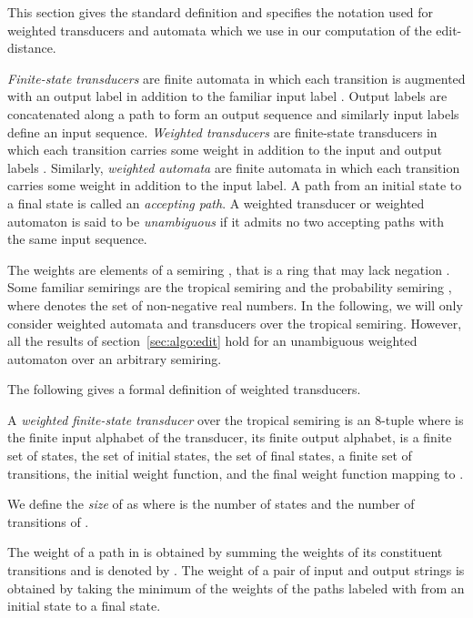 \documentclass{llncs}
\newcommand{\0}{\overline{0}}
\newcommand{\1}{\overline{1}}
\newcommand{\+}{\oplus}
\renewcommand{\.}{\otimes}
\begin{document}
This section gives the standard definition and specifies the notation
used for weighted transducers and automata which we use in our
computation of the edit-distance.

\emph{Finite-state transducers} are finite automata \cite{perrin} in
which each transition is augmented with an output label in addition to
the familiar input label \cite{berstel,eilenberg}. Output labels are
concatenated along a path to form an output sequence and similarly
input labels define an input sequence. \emph{Weighted transducers} are
finite-state transducers in which each transition carries some weight
in addition to the input and output labels
\cite{soittola,kuich}. Similarly, \emph{weighted automata} are finite
automata in which each transition carries some weight in addition to
the input label. A path from an initial state to a final state is
called an \emph{accepting path}. A weighted transducer or weighted
automaton is said to be \emph{unambiguous} if it admits no two
accepting paths with the same input sequence.

The weights are elements of a semiring , that is a ring that may
lack negation \cite{kuich}. Some familiar semirings are the tropical
semiring  and the probability semiring , where 
denotes the set of non-negative real numbers. In the following, we
will only consider weighted automata and transducers over the tropical
semiring. However, all the results of section~\ref{sec:algo:edit} hold
for an unambiguous weighted automaton  over an arbitrary semiring.

The following gives a formal definition of weighted transducers.

\begin{definition}
  A {\em weighted finite-state transducer}  over the tropical
  semiring  is an 8-tuple  where  is the finite
  input alphabet of the transducer,  its finite output
  alphabet,  is a finite set of states,  the set of
  initial states,  the set of final states,  a finite set of
  transitions,  the initial weight
  function, and  the final weight function
  mapping  to .

\end{definition}
We define the {\em size} of  as  where  is the number of states and  the number of
transitions of .

The weight of a path  in  is obtained by summing the weights
of its constituent transitions and is denoted by . The weight
of a pair of input and output strings  is obtained by taking
the minimum of the weights of the paths labeled with  from an
initial state to a final state.
\end{document}
